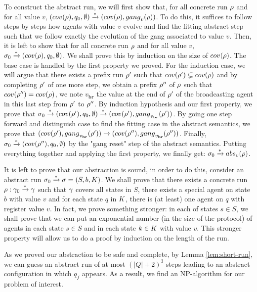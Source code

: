 To construct the abstract run, we will first show that, for all concrete run $\rho$ and for all value $v$, $(\statesin{\run}, q_0, \emptyset) \step{\ast}(\statesin{\run}, \gangof{v}{\run})$. To do this, it suffices to follow steps by steps how agents with value $v$ evolve and find the fitting abstract step such that we follow exactly the evolution of the gang associated to value $v$. 
Then, it is left to show that for all concrete run $\rho$ and for all value $v$, $\aconfiginit \step{\ast} (\statesin{\run}, q_0, \emptyset)$. We shall prove this by induction on the size of $\statesin{\run}$. The base case is handled by the first property we proved. For the induction case, we will argue that there exists a prefix run $\rho'$ such that $\statesin{\run'} \subsetneq \statesin{\run}$ and by completing $\rho'$ of one more step, we obtain a prefix $\rho''$ of $\rho$ such that $\statesin{\run''} = \statesin{\run}$, we note $v_{\mathbf{br}}$ the value at the end of $\rho'$ of the broadcasting agent in this last step from $\rho'$ to $\rho''$. By induction hypothesis and our first property, we prove that $\aconfiginit \step{\ast} (\statesin{\run'}, q_0, \emptyset) \step{\ast} (\statesin{\run'}, \gangof{v_{\mathbf{br}}}{\run'})$. By going one step forward and distinguish case to find the fitting case in the abstract semantics, we prove that $(\statesin{\run'}, \gangof{v_{\mathbf{br}}}{\run'}) \step{} (\statesin{\run''}, \gangof{v_{\mathbf{br}}}{\run''})$. Finally,  $\aconfiginit \step{\ast} (\statesin{\run''}, q_0, \emptyset)$ by the "gang reset" step of the abstract semantics. Putting everything together and applying the first property, we finally get: $\aconfiginit \step{\ast} \absproj{v}{\run}$.

It is left to prove that our abstraction is sound, in order to do this, consider an abstract run $\aconfiginit \step{\ast} \aconfig = (S, \boss, \clique)$. We shall prove that there exists a concrete run $\rho : \gamma_0 \xrightarrow{\ast} \gamma $ such that $\gamma$ covers all states in $S$, there exists a special agent on state $b$ with value $v$ and for each state $q$ in $\clique$, there is (at least) one agent on $q$ with register value $v$. In fact, we prove something stronger: in each of states $s\in S$, we shall prove that we can put an exponential number (in the size of the protocol) of agents in each state $s\in S$ and in each state $k\in \clique$ with value $v$. This stronger property will allow us to do a proof by induction on the length of the run. 

As we proved our abstraction to be safe and complete, by Lemma \ref{lem:short-run}, we can guess an abstract run of at most $(|Q| + 2)^3$ steps leading to an abstract configuration in which $q_f$ appears. As a result, we find an NP-algorithm for our problem of interest.


